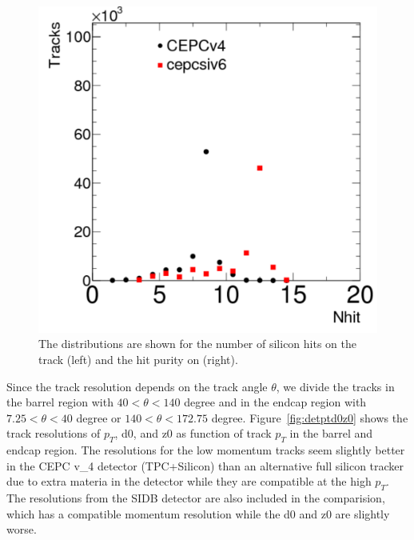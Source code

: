 \begin{figure}[hbtp]
\begin{center}
\includegraphics[width=0.45\textheight,keepaspectratio]{Figures/TrackingSystem/FullSilicon/Plot_muon_Nhit.pdf}
\caption{The distributions are shown for the number of silicon hits on the track (left) and the hit purity on (right).\label{fig:fullsinhit}}
\end{center}
\end{figure}


Since the track resolution depends on the track angle $\theta$, we divide the tracks in the barrel 
region with $40<\theta<140$ degree and in the endcap region with $7.25<\theta<40$ degree or $140<\theta<172.75$ degree. 
Figure~\ref{fig:detptd0z0} shows the track resolutions of $p_T$, d0, and z0 as function of track $p_T$ in the barrel and endcap region. 
The resolutions for the low momentum tracks seem slightly better in the CEPC v\_4 detector (TPC+Silicon) than an alternative full silicon tracker due 
to extra materia in the detector while they are compatible at the high $p_T$. 
The resolutions from the SIDB detector are also included in the comparision, which has a compatible momentum resolution 
while the d0 and z0 are slightly worse.


